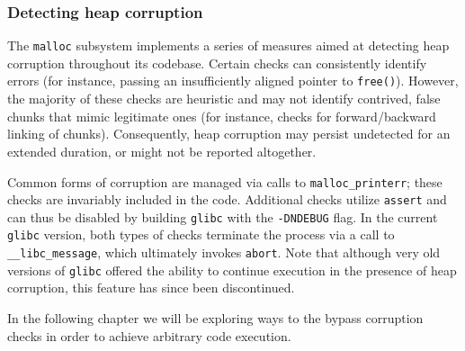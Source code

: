 \documentclass{article}
\begin{document}
\subsubsection{Detecting heap corruption}
The \texttt{malloc} subsystem implements a series of measures aimed at detecting
heap corruption throughout its codebase. Certain checks can consistently
identify errors (for instance, passing an insufficiently aligned pointer to
\texttt{free()}). However, the majority of these checks are heuristic and may
not identify contrived, false chunks that mimic legitimate ones (for instance,
checks for forward/backward linking of chunks). Consequently, heap corruption
may persist undetected for an extended duration, or might not be reported
altogether.

Common forms of corruption are managed via calls to \texttt{malloc\_printerr};
these checks are invariably included in the code. Additional checks utilize
\texttt{assert} and can thus be disabled by building \texttt{glibc} with the
\texttt{-DNDEBUG} flag. In the current \texttt{glibc} version, both types of
checks terminate the process via a call to \texttt{\_\_libc\_message}, which
ultimately invokes \texttt{abort}. Note that although very old versions of
\texttt{glibc} offered the ability to continue execution in the presence of heap
corruption, this feature has since been discontinued.

In the following chapter we will be exploring ways to the bypass corruption checks
in order to achieve arbitrary code execution.

\end{document}
